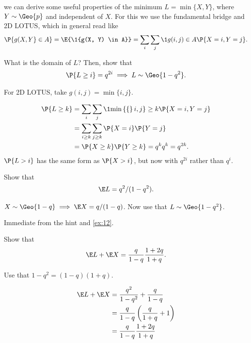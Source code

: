 \documentclass[a4paper]{article}
\begin{document}
 we can derive some useful properties of the minimum \(L=\min\{X, Y\}\), where \(Y\sim \Geo{p}\) and independent of \(X\). For this we use the fundamental bridge and 2D LOTUS, which in general read like
  \begin{equation*}
\P{g(X,Y}\in A\} = \E{\1{g(X, Y) \in A}} = \sum_{i}\sum_j \1{g(i, j)\in A} \P{X=i, Y=j}.
  \end{equation*}


\begin{exercise}
What is the domain of \(L\)? Then, show that
\begin{equation*}
\P{L\geq i}=q^{2i} \implies L\sim\Geo{1-q^{2}}.
\end{equation*}
\begin{hint}
For 2D LOTUS, take \(g(i,j) = \min\{i, j\}\).
\end{hint}
\begin{solution}
  \begin{align*}
\P{L\geq k}
&= \sum_{i}\sum_{j} \1{\min\{i,j\}\geq k} \P{X=i, Y=j}\\
&= \sum_{i\geq k} \sum_{j\geq k} \P{X=i}\P{Y=j}\\
&=  \P{X\geq k}\P{Y\geq k} = q^{k} q^{k} = q^{2k}.
  \end{align*}
\(\P{L>i}\) has the same form as \(\P{X>i}\), but now with \(q^{2i}\) rather than \(q^{i}\).
\end{solution}
\end{exercise}



\begin{exercise}
Show that
\begin{equation*}
\E L=q^{2}/(1-q^{2}).
\end{equation*}
\begin{hint}
\(X\sim \Geo{1-q} \implies \E X = q/(1-q)\). Now use that \(L\sim\Geo{1-q^{2}}\).
\end{hint}
\begin{solution}
Immediate from the hint and \cref{ex:12}.
\end{solution}
\label{ex:3}
\end{exercise}

\begin{exercise}
Show that
\begin{equation}
\label{eq:39}
\E L + \E X = \frac q{1-q}\frac{1+2q}{1+q}.
\end{equation}
\begin{hint}
Use that \(1-q^2=(1-q)(1+q)\).
\end{hint}
\begin{solution}
  \begin{align*}
\E L     + \E X
&= \frac{q^{2}}{1-q^2} + \frac{q}{1-q} \\
&= \frac q{1-q}\left(\frac{q}{1+q} + 1\right)\\
&= \frac q{1-q} \frac{1+2q}{1+q}
  \end{align*}
\end{solution}
\end{exercise}
\end{document}
